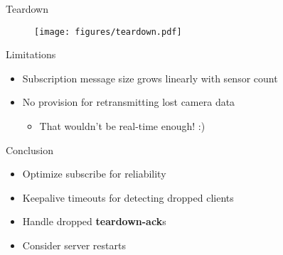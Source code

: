 \documentclass{beamer}
\begin{document}
\begin{frame}{Teardown}
\begin{figure}
	\texttt{[image: figures/teardown.pdf]}
\end{figure}
\end{frame}

\begin{frame}{Limitations}
\begin{itemize}
	\item Subscription message size grows linearly with sensor count
    \item No provision for retransmitting lost camera data
    \begin{itemize}
    	\item That wouldn't be real-time enough! :)
    \end{itemize}
\end{itemize}
\end{frame}

\begin{frame}{Conclusion}
\begin{itemize}
	\item Optimize subscribe for reliability
    \item Keepalive timeouts for detecting dropped clients
    \item Handle dropped \textbf{teardown-ack}s
    \item Consider server restarts
\end{itemize}
\end{frame}
\end{document}
